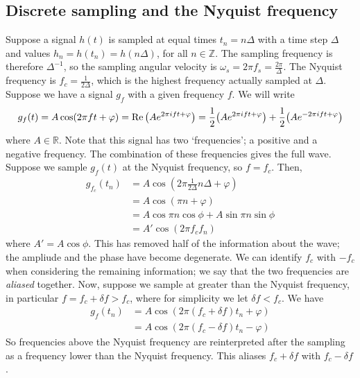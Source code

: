 \subsection{Discrete sampling and the Nyquist frequency}
Suppose a signal \( h(t) \) is sampled at equal times \( t_n = n\Delta \) with a time step \( \Delta \) and values \( h_n = h(t_n) = h(n\Delta) \), for all \( n \in \mathbb Z \).
The sampling frequency is therefore \( \Delta^{-1} \), so the sampling angular velocity is \( \omega_s = 2\pi f_s = \frac{2\pi}{\Delta} \).
The Nyquist frequency is \( f_c = \frac{1}{2\Delta} \), which is the highest frequency actually sampled at \( \Delta \).
Suppose we have a signal \( g_f \) with a given frequency \( f \).
We will write
\[
	g_f(t) = A \cos(2\pi f t + \varphi) = \Re \qty(A e^{2 \pi i f t + \varphi}) = \frac{1}{2} \qty(A e^{2 \pi i f t + \varphi}) + \frac{1}{2} \qty(A e^{-2 \pi i f t + \varphi})
\]
where \( A \in \mathbb R \).
Note that this signal has two `frequencies'; a positive and a negative frequency.
The combination of these frequencies gives the full wave.
Suppose we sample \( g_f(t) \) at the Nyquist frequency, so \( f = f_c \).
Then,
\begin{align*}
	g_{f_c}(t_n) & = A \cos(2 \pi \frac{1}{2\Delta} n \Delta + \varphi) \\
	             & = A \cos(\pi n + \varphi)                            \\
	             & = A \cos \pi n \cos \phi + A \sin \pi n \sin \phi    \\
	             & = A' \cos(2\pi f_c f_n)
\end{align*}
where \( A' = A \cos \phi \).
This has removed half of the information about the wave; the ampliude and the phase have become degenerate.
We can identify \( f_c \) with \( -f_c \) when considering the remaining information; we say that the two frequencies are \textit{aliased} together.
Now, suppose we sample at greater than the Nyquist frequency, in particular \( f = f_c + \delta f > f_c \), where for simplicity we let \( \delta f < f_c \).
We have
\begin{align*}
	g_f(t_n) & = A \cos(2\pi (f_c + \delta f)t_n + \varphi) \\
	         & = A \cos(2\pi (f_c - \delta f)t_n - \varphi)
\end{align*}
So frequencies above the Nyquist frequency are reinterpreted after the sampling as a frequency lower than the Nyquist frequency.
This aliases \( f_c + \delta f \) with \( f_c - \delta f \).

